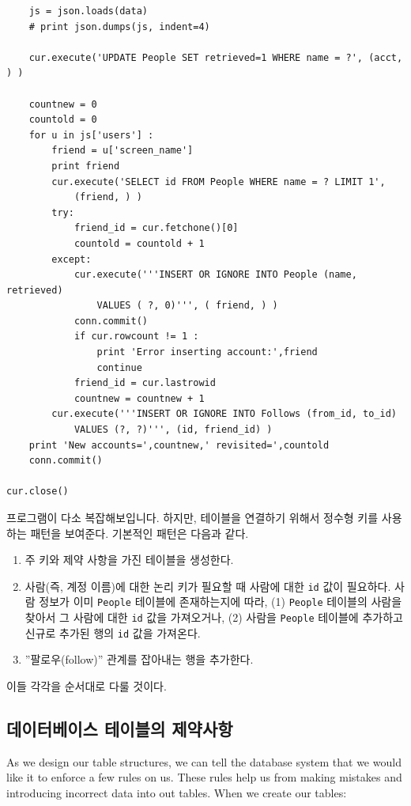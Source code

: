 \begin{verbatim}
    js = json.loads(data)
    # print json.dumps(js, indent=4)

    cur.execute('UPDATE People SET retrieved=1 WHERE name = ?', (acct, ) )

    countnew = 0
    countold = 0
    for u in js['users'] :
        friend = u['screen_name']
        print friend
        cur.execute('SELECT id FROM People WHERE name = ? LIMIT 1', 
            (friend, ) )
        try:
            friend_id = cur.fetchone()[0]
            countold = countold + 1
        except:
            cur.execute('''INSERT OR IGNORE INTO People (name, retrieved) 
                VALUES ( ?, 0)''', ( friend, ) )
            conn.commit()
            if cur.rowcount != 1 :
                print 'Error inserting account:',friend
                continue
            friend_id = cur.lastrowid
            countnew = countnew + 1
        cur.execute('''INSERT OR IGNORE INTO Follows (from_id, to_id) 
            VALUES (?, ?)''', (id, friend_id) )
    print 'New accounts=',countnew,' revisited=',countold
    conn.commit()

cur.close()
\end{verbatim}
\afterverb
%

프로그램이 다소 복잡해보입니다. 하지만, 테이블을 연결하기 위해서 정수형 키를 사용하는 패턴을 보여준다.
기본적인 패턴은 다음과 같다.

\begin{enumerate}

\item 주 키와 제약 사항을 가진 테이블을 생성한다.

\item 사람(즉, 계정 이름)에 대한 논리 키가 필요할 때 사람에 대한 {\tt id} 값이 필요하다.
사람 정보가 이미 {\tt People} 테이블에 존재하는지에 따라,
(1) {\tt People} 테이블의 사람을 찾아서 그 사람에 대한 {\tt id} 값을 가져오거나,
(2) 사람을 {\tt People} 테이블에 추가하고 신규로 추가된 행의 {\tt id} 값을 가져온다.

\item ''팔로우(follow)'' 관계를 잡아내는 행을 추가한다.

\end{enumerate}

이들 각각을 순서대로 다룰 것이다.

\subsection{ 데이터베이스 테이블의 제약사항}

As we design our table structures, we can tell the database system 
that we would like it to enforce a few rules on us.   These rules
help us from making mistakes and introducing incorrect data into 
out tables.   When we create our tables:

